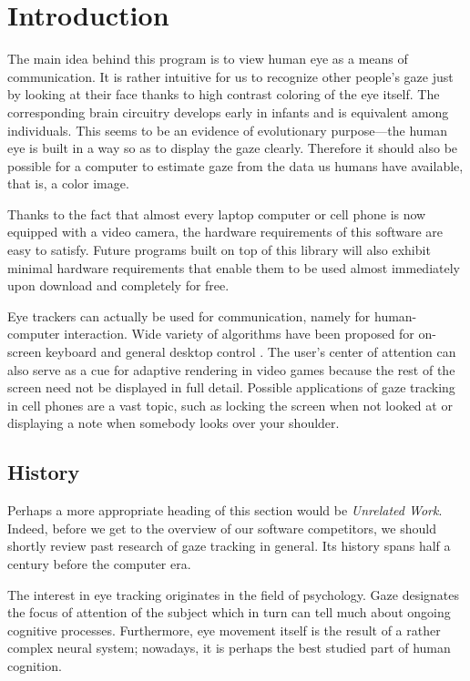 \chapter{Introduction}

The main idea behind this program is to view human eye as a means of communication.
It is rather intuitive for us to recognize other people's gaze just by looking at their face thanks to high contrast coloring of the eye itself.
The corresponding brain circuitry develops early in infants  and is equivalent among individuals.
This seems to be an evidence of evolutionary purpose---the human eye is built in a way so as to display the gaze clearly.
Therefore it should also be possible for a computer to estimate gaze from the data us humans have available, that is, a color image.

Thanks to the fact that almost every laptop computer or cell phone is now equipped with a video camera, the hardware requirements of this software are easy to satisfy.
Future programs built on top of this library will also exhibit minimal hardware requirements that enable them to be used almost immediately upon download and completely for free.

Eye trackers can actually be used for communication, namely for human-computer interaction.
Wide variety of algorithms have been proposed for on-screen keyboard and general desktop control \cite{majaranta02}.
The user's center of attention can also serve as a cue for adaptive rendering in video games because the rest of the screen need not be displayed in full detail.
Possible applications of gaze tracking in cell phones are a vast topic, such as locking the screen when not looked at or displaying a note when somebody looks over your shoulder.


\section{History}

Perhaps a more appropriate heading of this section would be \textit{Unrelated Work}.
Indeed, before we get to the overview of our software competitors, we should shortly review past research of gaze tracking in general.
Its history spans half a century before the computer era.

The interest in eye tracking originates in the field of psychology.
Gaze designates the focus of attention of the subject which in turn can tell much about ongoing cognitive processes.
Furthermore, eye movement itself is the result of a rather complex neural system; nowadays, it is perhaps the best studied part of human cognition.

